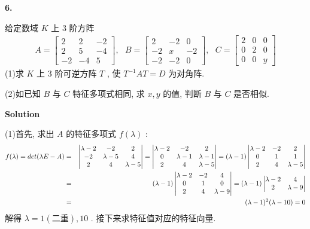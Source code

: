 \documentclass[11pt,a4paper,openany,oneside]{book}
\newcommand\Solution{\noindent\textbf{\textsf{Solution}}\par\medskip}
\begin{document}
\begin{myexample}
	\textbf{6.}

给定数域 $ K $ 上 $ 3 $ 阶方阵
\begin{gather*}
A=
\begin{bmatrix}
2  &  2  &  -2  \\
2  &  5  &  -4 \\
-2  &  -4  &  5
\end{bmatrix}, \ \ \ 
B=
\begin{bmatrix}
2  &  -2  &  0  \\
-2  &  x  &  -2  \\
-2  &  -2  &  0
\end{bmatrix}, \ \ \ 
C=
\begin{bmatrix}
2  &  0  &  0  \\
0  &  2  &  0  \\
0  &  0  &  y
\end{bmatrix}
\end{gather*}
(1)求 $ K $ 上 $ 3 $ 阶可逆方阵 $ T $ , 使 $ T^{-1}AT=D $ 为对角阵. 

(2)如已知 $ B $ 与 $ C $ 特征多项式相同, 求 $ x, y $ 的值, 判断 $ B $ 与 $ C $ 是否相似. \\

\end{myexample}
\Solution 

(1)首先, 求出 $ A $ 的特征多项式 $ f(\lambda) $ :
\begin{eqnarray}
f(\lambda) = det(\lambda E-A) &=&
\begin{vmatrix}
\lambda-2  &  -2  &  2    \\
-2  & \lambda-5  &  4   \\
2  &  4  &  \lambda-5
\end{vmatrix}=
\begin{vmatrix}
\lambda-2  &  -2  &  2    \\
0  &  \lambda-1  &  \lambda-1  \\
2  &  4  &  \lambda-5
\end{vmatrix} =(\lambda-1)
\begin{vmatrix}
\lambda-2  &  -2  &  2    \\
0  &  1  &  1  \\
2  &  4  &  \lambda-5
\end{vmatrix} \notag\\
&=&(\lambda-1)
\begin{vmatrix}
\lambda-2  &  -2  &  4  \\
0  &  1  &  0  \\
2  &  4  &  \lambda -9 
\end{vmatrix}=(\lambda-1)
\begin{vmatrix}
\lambda-2  &  4  \\
2  &  \lambda -9 \\
\end{vmatrix} \notag\\
&=&
(\lambda-1)^2(\lambda-10)=0  \notag
\end{eqnarray}
解得 $ \lambda=1(\text{二重}), 10 $ . 接下来求特征值对应的特征向量. \\
\end{document}
